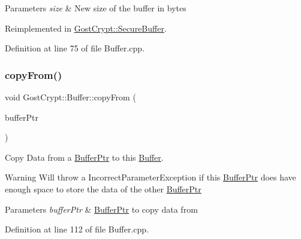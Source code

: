 \begin{DoxyParams}{Parameters}
{\em size} & New size of the buffer in bytes \\
\hline
\end{DoxyParams}


Reimplemented in \hyperlink{class_gost_crypt_1_1_secure_buffer_a832c1af234c29e1dc1521fed24d3265a}{Gost\+Crypt\+::\+Secure\+Buffer}.



Definition at line 75 of file Buffer.\+cpp.

\mbox{\label{class_gost_crypt_1_1_buffer_aebc942f433bb27ef5712a59631ed0137}} 
\subsubsection{\texorpdfstring{copy\+From()}{copyFrom()}}
{\footnotesize\ttfamily void Gost\+Crypt\+::\+Buffer\+::copy\+From (\begin{DoxyParamCaption}\item[{const \hyperlink{class_gost_crypt_1_1_buffer_ptr}{Buffer\+Ptr} \&}]{buffer\+Ptr }\end{DoxyParamCaption})\hspace{0.3cm}{\ttfamily [virtual]}}



Copy Data from a \hyperlink{class_gost_crypt_1_1_buffer_ptr}{Buffer\+Ptr} to this \hyperlink{class_gost_crypt_1_1_buffer}{Buffer}. 

\begin{DoxyWarning}{Warning}
Will throw a Incorrect\+Parameter\+Exception if this \hyperlink{class_gost_crypt_1_1_buffer_ptr}{Buffer\+Ptr} does have enough space to store the data of the other \hyperlink{class_gost_crypt_1_1_buffer_ptr}{Buffer\+Ptr} 
\end{DoxyWarning}

\begin{DoxyParams}{Parameters}
{\em buffer\+Ptr} & \hyperlink{class_gost_crypt_1_1_buffer_ptr}{Buffer\+Ptr} to copy data from \\
\hline
\end{DoxyParams}


Definition at line 112 of file Buffer.\+cpp.

\mbox{\label{class_gost_crypt_1_1_buffer_a6c340b4919d3a0476c6076136fe469a0}} 
